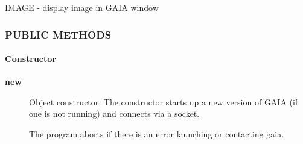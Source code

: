 IMAGE - display image in GAIA window

\subsubsection*{PUBLIC METHODS\label{ORAC::Display::GAIA_PUBLIC_METHODS}}
\paragraph*{Constructor\label{ORAC::Display::GAIA_Constructor}}
\begin{description}

\item[\textbf{new}] \mbox{}

Object constructor. The constructor starts up a new version of
GAIA (if one is not running) and connects via a socket.



The program aborts if there is an error launching or contacting
gaia.

\end{description}
